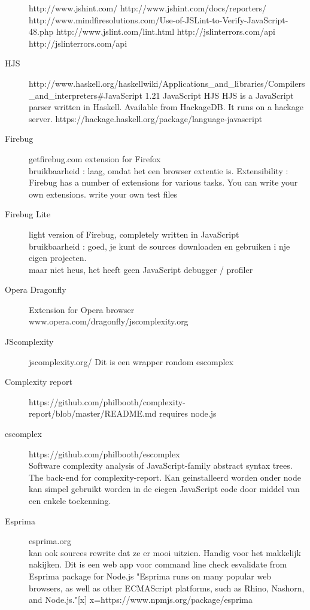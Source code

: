 \documentclass{article}
\begin{document}
\begin{description}
http://www.jshint.com/
http://www.jshint.com/docs/reporters/
http://www.mindfiresolutions.com/Use-of-JSLint-to-Verify-JavaScript-48.php
http://www.jslint.com/lint.html
http://jslinterrors.com/api
http://jslinterrors.com/api

\item[HJS]
http://www.haskell.org/haskellwiki/Applications\_and\_libraries/Compilers\_and\_interpreters\#JavaScript
1.21 JavaScript
HJS
HJS is a JavaScript parser written in Haskell. Available from HackageDB.
It runs on a hackage server.
https://hackage.haskell.org/package/language-javascript

\item[Firebug]getfirebug.com
extension for Firefox\\
bruikbaarheid : laag, omdat het een browser extentie is.
Extensibility : Firebug has a number of extensions for various tasks. You can write your own extensions.
write your own test files

\item [Firebug Lite]light version of Firebug, completely written in JavaScript\\
bruikbaarheid : goed, je kunt de sources downloaden en gebruiken i nje eigen projecten.\\
maar niet heus, het heeft geen JavaScript debugger / profiler

\item[Opera Dragonfly]Extension for Opera browser\\
www.opera.com/dragonfly/jscomplexity.org

\item[JScomplexity]jscomplexity.org/
Dit is een wrapper rondom escomplex

\item[Complexity report]https://github.com/philbooth/complexity-report/blob/master/README.md   requires node.js

\item[escomplex]https://github.com/philbooth/escomplex\\
Software complexity analysis of JavaScript-family abstract syntax trees. The back-end for complexity-report.
Kan geinstalleerd worden onder node\\
kan simpel gebruikt worden in de eiegen JavaScript code door middel van een enkele toekenning.\\

\item[Esprima]esprima.org\\
kan ook sources rewrite dat ze er mooi uitzien. Handig voor het makkelijk nakijken.
Dit is een web app
voor command line check esvalidate from Esprima package for Node.js
"Esprima runs on many popular web browsers, as well as other ECMAScript platforms, such as Rhino, Nashorn, and Node.js."[x]
x=https://www.npmjs.org/package/esprima


\end{description}
\end{document}

